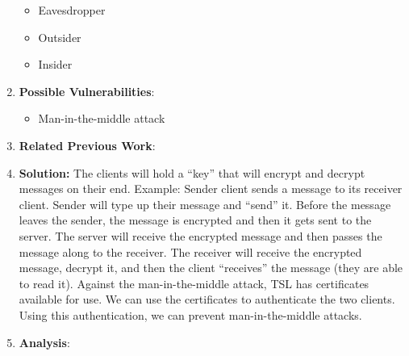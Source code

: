 \documentclass{article}
\begin{document}
\begin{enumerate}
    	\begin {itemize}
            \item Eavesdropper
		    \item Outsider
		    \item Insider
        \end {itemize}
    \item \textbf {Possible Vulnerabilities}:
    	\begin {itemize}
        	\item Man-in-the-middle attack
        \end {itemize}
    \item \textbf {Related Previous Work}:
    \item \textbf {Solution:} The clients will hold a “key” that will encrypt and decrypt messages
     on their end. 
    Example: Sender client sends a message to its receiver client. Sender will type up their message
    and “send” it. Before the message leaves the sender, the message is encrypted and then it gets
    sent to the server. The server will receive the encrypted message and then passes the message
    along to the receiver. The receiver will receive the encrypted message, decrypt it, and then the
     client “receives” the message (they are able to read it).\newline
    Against the man-in-the-middle attack, TSL has certificates available for use. We can use the
     certificates to authenticate the two clients. Using this authentication, we can prevent 
     man-in-the-middle attacks.
	\item \textbf{Analysis}:
\end{enumerate}
\end{document}
